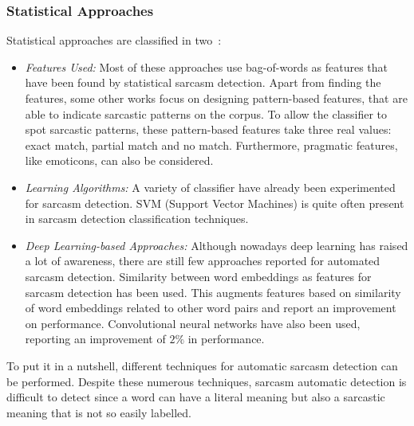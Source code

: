 \subsubsection{Statistical Approaches}
Statistical approaches are classified in two~\cite{joshi2017automatic}:
\begin{itemize}
    \item \textit{Features Used:} Most of these approaches use bag-of-words as features that have been found by statistical sarcasm detection. Apart from finding the features, some other works focus on designing pattern-based features, that are able to indicate sarcastic patterns on the corpus. To allow the classifier to spot sarcastic patterns, these pattern-based features take three real values: exact match, partial match and no match. Furthermore, pragmatic features, like emoticons, can also be considered.
    \item \textit{Learning Algorithms:} A variety of classifier have already been experimented for sarcasm detection. SVM (Support Vector Machines) is quite often present in sarcasm detection classification techniques.
    \item \textit{Deep Learning-based Approaches:} Although nowadays deep learning has raised a lot of awareness, there are still few approaches reported for automated sarcasm detection. Similarity between word embeddings as features for sarcasm detection has been used. This augments features based on similarity of word embeddings related to other word pairs and report an improvement on performance. Convolutional neural networks have also been used, reporting an improvement of $2\%$ in performance.
\end{itemize}

To put it in a nutshell, different techniques for automatic sarcasm detection can be performed. Despite these numerous techniques, sarcasm automatic detection is difficult to detect since a word can have a literal meaning but also a sarcastic meaning that is not so easily labelled.
